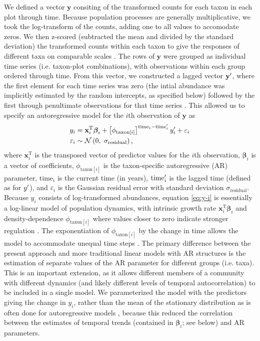 We defined a vector $\mathbf{y}$ consiting of the transformed counts
for each taxon in each plot through time.
Because population processes are generally multiplicative,
we took the log-transform of the counts,
adding one to all values to accomodate zeros.
We then z-scored (subtracted the mean and divided by the standard deviation)
the transformed counts within each taxon
to give the responses of different taxa on comparable scales \citep{Jackson2012}.
The rows of $\mathbf{y}$ were grouped as individual time series
(i.e. taxon-plot combinations),
with observations within each group ordered through time.
From this vector,
we constructed a lagged vector $\mathbf{y\sp{\prime}}$,
where the first element for each time series was zero
(the intial abundance was implicitly estimated by the random intercepts,
as specified below)
followed by the first through
penultimate observations for that time series \citep{Ives2006}.
This allowed us to specify an autoregressive model for the $i$th observation of
$\mathbf{y}$ as
%
\begin{equation} \label{eq:y-i}
\begin{split}
    y_i &= \mathbf{x}_i^\text{T} {\boldsymbol\beta}_i +
        \left[ \phi_{\text{taxon}[i]} \right]^{\text{time}_i - \text{time}\sp{\prime}_i}
        y\sp{\prime}_i + \varepsilon_i \\
    \varepsilon_i &\sim \mathcal{N} \left(0, \; \sigma_{\text{residual}} \right)
    \text{,}
\end{split}
\end{equation}
%
\noindent where $\mathbf{x}_i^\text{T}$ is the transposed vector
of predictor values for the $i$th observation,
${\boldsymbol\beta}_i$ is a vector of coefficients,
$\phi_{\text{taxon}[i]}$ is the taxon-specific autoregressive (AR) parameter,
$\text{time}_i$ is the current time (in years),
$\text{time}\sp{\prime}_i$ is the lagged time (defined as for  $y\sp{\prime}$),
and $\varepsilon_i$  is the Gaussian residual
error with standard deviation $\sigma_{\text{residual}}$.
Because $y_i$ consists of log-transformed abundances, equation \ref{eq:y-i} is
essentially a log-linear model of population dynamics, with intrinsic growth rate
$\mathbf{x}_i^\text{T} {\boldsymbol\beta}_i$ and
density-dependence $\phi_{\text{taxon}[i]}$
where values closer to zero indicate stronger regulation \citep{Ives2010}.
The exponentiation of $\phi_{\text{taxon}[i]}$ by the change in time allows the model
to accommodate unequal time steps \citep{Zuur2009}.
The primary difference between the present approach and more traditional linear models
with AR structures \citep[e.g., ][]{Zuur2009} is the estimation of separate values of the AR
parameter for different groups (i.e. taxa).
This is an important extension, as it allows different members of a community with
different dynamics (and likely different levels of temporal autocorrelation)
to be included in a single model.
We parameterized the model with the predictors giving the change in $y_i$,
rather than the mean of the stationary distribution as is often done
for autoregressive models \citep{Harvey1990, Ives2006},
because this reduced the correlation between the estimates of temporal trends
(contained in ${\boldsymbol\beta}_i$; see below) and AR parameters.


